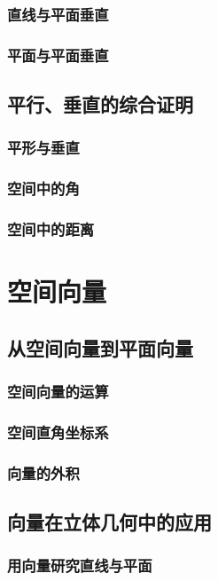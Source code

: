 \subsection{直线与平面垂直}
\clearpage
\subsection{平面与平面垂直}
\clearpage

\section{平行、垂直的综合证明}
\subsection{平形与垂直}
\clearpage
\subsection{空间中的角}
\clearpage
\subsection{空间中的距离}
\clearpage


\chapter{空间向量}


\section{从空间向量到平面向量}
\subsection{空间向量的运算}
\clearpage
\subsection{空间直角坐标系}
\clearpage
\subsection{向量的外积}
\clearpage

\section{向量在立体几何中的应用}

\subsection{用向量研究直线与平面}


